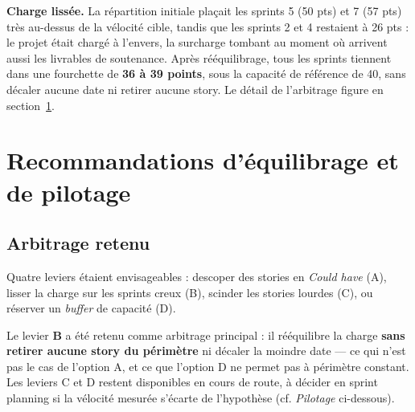 
\begin{encadre}
\textbf{Charge lissée.} La répartition initiale plaçait les sprints 5
(50 pts) et 7 (57 pts) très au-dessus de la vélocité cible, tandis que les
sprints 2 et 4 restaient à 26 pts : le projet était chargé à l'envers, la
surcharge tombant au moment où arrivent aussi les livrables de soutenance.
Après rééquilibrage, tous les sprints tiennent dans une fourchette de
\textbf{36 à 39 points}, sous la capacité de référence de 40, sans décaler
aucune date ni retirer aucune story. Le détail de l'arbitrage figure en
section~\ref{sec:recommandations}.
\end{encadre}

\section{Recommandations d'équilibrage et de pilotage}
\label{sec:recommandations}

\subsection{Arbitrage retenu}

Quatre leviers étaient envisageables : descoper des stories en
\emph{Could have} (A), lisser la charge sur les sprints creux (B), scinder
les stories lourdes (C), ou réserver un \emph{buffer} de capacité (D).

Le levier \textbf{B} a été retenu comme arbitrage principal : il rééquilibre
la charge \textbf{sans retirer aucune story du périmètre} ni décaler la
moindre date --- ce qui n'est pas le cas de l'option A, et ce que l'option D
ne permet pas à périmètre constant. Les leviers C et D restent disponibles
en cours de route, à décider en sprint planning si la vélocité mesurée
s'écarte de l'hypothèse (cf. \emph{Pilotage} ci-dessous).

